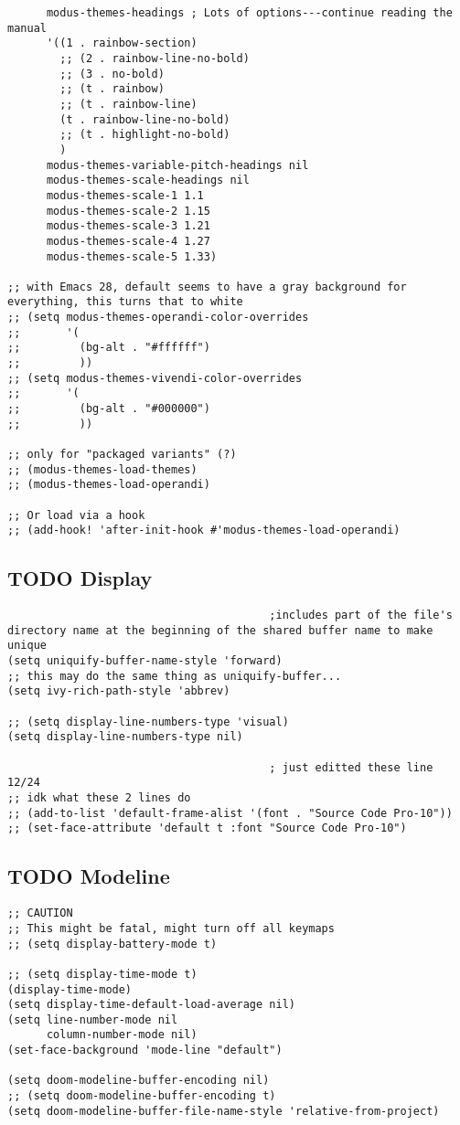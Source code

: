\documentclass[8pt]{article}
\begin{document}
\begin{verbatim}
      modus-themes-headings ; Lots of options---continue reading the manual
      '((1 . rainbow-section)
        ;; (2 . rainbow-line-no-bold)
        ;; (3 . no-bold)
        ;; (t . rainbow)
        ;; (t . rainbow-line)
        (t . rainbow-line-no-bold)
        ;; (t . highlight-no-bold)
        )
      modus-themes-variable-pitch-headings nil
      modus-themes-scale-headings nil
      modus-themes-scale-1 1.1
      modus-themes-scale-2 1.15
      modus-themes-scale-3 1.21
      modus-themes-scale-4 1.27
      modus-themes-scale-5 1.33)

;; with Emacs 28, default seems to have a gray background for everything, this turns that to white
;; (setq modus-themes-operandi-color-overrides
;;       '(
;;         (bg-alt . "#ffffff")
;;         ))
;; (setq modus-themes-vivendi-color-overrides
;;       '(
;;         (bg-alt . "#000000")
;;         ))

;; only for "packaged variants" (?)
;; (modus-themes-load-themes)
;; (modus-themes-load-operandi)

;; Or load via a hook
;; (add-hook! 'after-init-hook #'modus-themes-load-operandi)
\end{verbatim}
\subsection{{\bfseries\sffamily TODO} Display}
\label{sec:orgee5b454}
\begin{verbatim}
                                        ;includes part of the file's directory name at the beginning of the shared buffer name to make unique
(setq uniquify-buffer-name-style 'forward)
;; this may do the same thing as uniquify-buffer...
(setq ivy-rich-path-style 'abbrev)

;; (setq display-line-numbers-type 'visual)
(setq display-line-numbers-type nil)

                                        ; just editted these line 12/24
;; idk what these 2 lines do
;; (add-to-list 'default-frame-alist '(font . "Source Code Pro-10"))
;; (set-face-attribute 'default t :font "Source Code Pro-10")
\end{verbatim}
\subsection{{\bfseries\sffamily TODO} Modeline}
\label{sec:org2a08cf1}
\begin{verbatim}
;; CAUTION
;; This might be fatal, might turn off all keymaps
;; (setq display-battery-mode t)

;; (setq display-time-mode t)
(display-time-mode)
(setq display-time-default-load-average nil)
(setq line-number-mode nil
      column-number-mode nil)
(set-face-background 'mode-line "default")

(setq doom-modeline-buffer-encoding nil)
;; (setq doom-modeline-buffer-encoding t)
(setq doom-modeline-buffer-file-name-style 'relative-from-project)
\end{verbatim}
\end{document}
